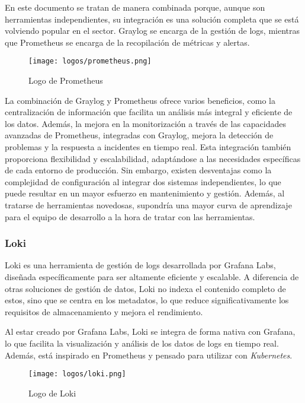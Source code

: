 En este documento se tratan de manera combinada porque, aunque son herramientas
independientes, su integración es una solución completa que se está volviendo
popular en el sector. Graylog se encarga de la gestión de logs, mientras que
Prometheus se encarga de la recopilación de métricas y alertas.

\begin{figure}[H]
	\centering
	\texttt{[image: logos/prometheus.png]}
	\caption{Logo de Prometheus~\textregistered}
\end{figure}

La combinación de Graylog y Prometheus ofrece varios beneficios, como la
centralización de información que facilita un análisis más integral y
eficiente de los datos. Además, la mejora en la monitorización a través de las
capacidades avanzadas de Prometheus, integradas con Graylog, mejora la detección
de problemas y la respuesta a incidentes en tiempo real. Esta integración
también proporciona flexibilidad y escalabilidad, adaptándose a las necesidades
específicas de cada entorno de producción. Sin embargo, existen desventajas como
la complejidad de configuración al integrar dos sistemas independientes, lo que
puede resultar en un mayor esfuerzo en mantenimiento y gestión. Además, al
tratarse de herramientas novedosas, supondría una mayor curva de aprendizaje
para el equipo de desarrollo a la hora de tratar con las herramientas.


\newpage{}
\subsubsection{Loki}
Loki es una herramienta de gestión de logs desarrollada por Grafana Labs,
diseñada específicamente para ser altamente eficiente y escalable. A diferencia
de otras soluciones de gestión de datos, Loki no indexa el contenido completo de
estos, sino que se centra en los metadatos, lo que reduce significativamente
los requisitos de almacenamiento y mejora el rendimiento.

Al estar creado por Grafana Labs, Loki se integra de forma nativa con Grafana,
lo que facilita la visualización y análisis de los datos de logs en tiempo real.
Además, está inspirado en Prometheus y pensado para utilizar con
\textit{Kubernetes}.

\begin{figure}[H]
	\centering
	\texttt{[image: logos/loki.png]}
	\caption{Logo de Loki~\textregistered}
\end{figure}

